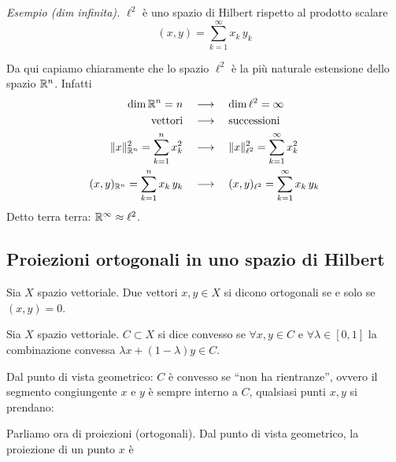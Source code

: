 \textit{Esempio (dim infinita).}
$\ell^{2}$ è uno spazio di Hilbert rispetto al prodotto scalare 
\begin{equation*}
(x,y)=\sum_{k=1}^\infty x_k\,y_k
\end{equation*}

\begin{marker}
Da qui capiamo chiaramente che lo spazio $\ell^2$ è la più naturale estensione dello spazio $\mathbb{R}^n$. Infatti
\begin{align*}
\dim\mathbb{R}^n=n \quad &\longrightarrow \quad \dim\ell^2=\infty \\
\text{vettori} \quad &\longrightarrow \quad \text{successioni} \\
\Vert x\Vert^2_{\mathbb{R}^n}=\sum_{k=1}^n x_k^2 \quad &\longrightarrow \quad \Vert x\Vert^2_{\ell^2}=\sum_{k=1}^\infty x_k^2 \\
(x,y)_{\mathbb{R}^n}=\sum_{k=1}^n x_k\, y_k \quad &\longrightarrow \quad (x,y)_{\ell^2}=\sum_{k=1}^\infty x_k\, y_k
\end{align*}
Detto terra terra: $\mathbb{R}^\infty\approx\ell^2$.  
\end{marker}


\subsection{Proiezioni ortogonali in uno spazio di Hilbert} %
\label{sub:proiezioni_ortogonali_in_uno_spazio_di_hilbert}

\begin{defn}
Sia $X$ spazio vettoriale. Due vettori $x,y\in X$ si dicono ortogonali se e solo se $(x,y)=0$.
\end{defn}

\begin{defn}
Sia $X$ spazio vettoriale. $C\subset X$ si dice convesso se $\forall x, y\in C$ e $\forall \lambda \in [0, 1]$ la combinazione convessa $\lambda x + (1 - \lambda) y\in C$.
\end{defn}

Dal punto di vista geometrico: $C$ è convesso se ``non ha rientranze'', ovvero il segmento congiungente $x$ e $y$ è sempre interno a $C$, qualsiasi punti $x,y$ si prendano:


Parliamo ora di proiezioni (ortogonali). Dal punto di vista geometrico, la proiezione di un punto $x$ è


